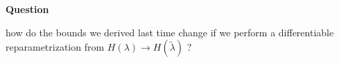 \documentclass[main_zanardi.tex]{subfiles}
\begin{document}
\begin{bluebox}
  \textbf{Question}

  how do the bounds we derived last time change if we perform a differentiable reparametrization from \(H(\lambda) \rightarrow H(\widetilde{\lambda} )\) ?
\end{bluebox}
\end{document}
